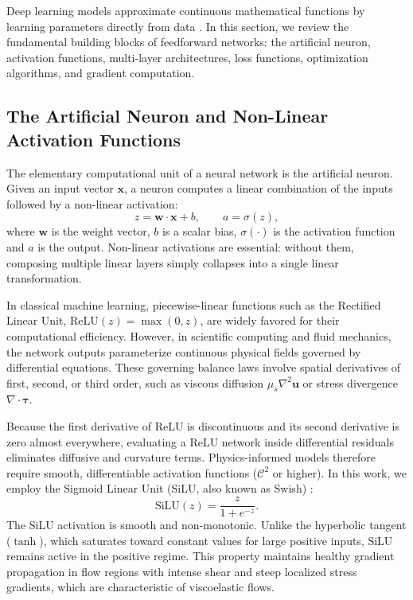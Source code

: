 Deep learning models approximate continuous mathematical functions
by learning parameters directly from data \cite{goodfellow2016deep}.
In this section, we review the fundamental building blocks of feedforward networks:
the artificial neuron, activation functions, multi-layer architectures,
loss functions, optimization algorithms, and gradient computation.

\subsection{The Artificial Neuron and Non-Linear Activation Functions}
\label{subsec:perceptron_activations}

The elementary computational unit of a neural network is the artificial neuron.
Given an input vector $\boldsymbol{x}$,
a neuron computes a linear combination of the inputs followed by a non-linear activation:
\begin{equation}
    z = \boldsymbol{w} \cdot \boldsymbol{x} + b , \qquad a = \sigma(z) ,
    \label{eq:single_neuron}
\end{equation}
where $\boldsymbol{w}$ is the weight vector, $b$ is a scalar bias, $\sigma(\cdot)$ is the activation function and $a$ is the output.
Non-linear activations are essential:
without them, composing multiple linear layers simply collapses into a single linear transformation.

In classical machine learning, piecewise-linear functions such as the Rectified Linear Unit,
$\text{ReLU}(z) = \max(0, z)$, are widely favored for their computational efficiency.
However, in scientific computing and fluid mechanics,
the network outputs parameterize continuous physical fields governed by differential equations.
These governing balance laws involve spatial derivatives of first, second, or third order,
such as viscous diffusion $\mu_s \nabla^2 \boldsymbol{u}$ or stress divergence $\nabla \cdot \boldsymbol{\tau}$.

Because the first derivative of ReLU is discontinuous and its second derivative is zero almost everywhere,
evaluating a ReLU network inside differential residuals eliminates diffusive and curvature terms.
Physics-informed models therefore require smooth, differentiable activation functions ($\mathcal{C}^2$ or higher).
In this work, we employ the Sigmoid Linear Unit (SiLU, also known as Swish) \cite{goodfellow2016deep}:
\begin{equation}
    \text{SiLU}(z) = \frac{z}{1 + e^{-z}} .
    \label{eq:silu_activation}
\end{equation}
The SiLU activation is smooth and non-monotonic.
Unlike the hyperbolic tangent ($\tanh$), which saturates toward constant values for large positive inputs,
SiLU remains active in the positive regime.
This property maintains healthy gradient propagation in flow regions with intense shear
and steep localized stress gradients, which are characteristic of viscoelastic flows.

